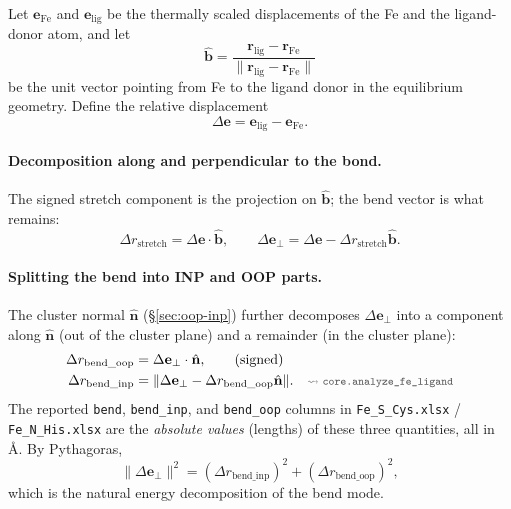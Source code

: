 \documentclass[11pt,a4paper,twoside]{article}
\newcommand{\evec}{\mathbf{e}}
\newcommand{\rvec}{\mathbf{r}}
\newcommand{\codref}[1]{%
  \quad\text{\textcolor{gray!70!black}{\footnotesize $\rightsquigarrow$~\texttt{#1}}}}
\theoremstyle{remark}
\begin{document}
Let $\evec_\text{Fe}$ and $\evec_\text{lig}$ be the thermally
scaled displacements of the Fe and the ligand-donor atom, and let
\begin{equation}
  \hat{\mathbf{b}} = \frac{\rvec_\text{lig} - \rvec_\text{Fe}}
                            {\lVert\rvec_\text{lig} - \rvec_\text{Fe}\rVert}
\end{equation}
be the unit vector pointing from Fe to the ligand donor in the
equilibrium geometry. Define the relative displacement
\begin{equation}
  \Delta\evec = \evec_\text{lig} - \evec_\text{Fe}.
  \label{eq:fe-lig-delta}
\end{equation}

\paragraph{Decomposition along and perpendicular to the bond.}
The signed stretch component is the projection on $\hat{\mathbf{b}}$;
the bend vector is what remains:
\begin{equation}
  \Delta r_\text{stretch} = \Delta\evec \cdot \hat{\mathbf{b}},
  \qquad
  \Delta\evec_\perp = \Delta\evec
                       - \Delta r_\text{stretch}\hat{\mathbf{b}}.
  \label{eq:fe-lig-perp}
\end{equation}

\paragraph{Splitting the bend into INP and OOP parts.}
The cluster normal $\hat{\mathbf{n}}$ (\S\ref{sec:oop-inp}) further
decomposes $\Delta\evec_\perp$ into a component along $\hat{\mathbf{n}}$
(out of the cluster plane) and a remainder (in the cluster plane):
\begin{align}
  \Delta r_\text{bend\_oop} &= \Delta\evec_\perp \cdot \hat{\mathbf{n}},
  \qquad\text{(signed)} \\
  \Delta r_\text{bend\_inp} &= \lVert\Delta\evec_\perp
       - \Delta r_\text{bend\_oop}\hat{\mathbf{n}}\rVert.
  \codref{core.analyze\_fe\_ligand}
  \label{eq:fe-lig-bend-split}
\end{align}
The reported \texttt{bend}, \texttt{bend\_inp}, and \texttt{bend\_oop}
columns in \texttt{Fe\_S\_Cys.xlsx} / \texttt{Fe\_N\_His.xlsx} are
the \emph{absolute values} (lengths) of these three quantities, all
in \AA{}. By Pythagoras,
\begin{equation}
  \lVert\Delta\evec_\perp\rVert^2
    = (\Delta r_\text{bend\_inp})^2 + (\Delta r_\text{bend\_oop})^2,
\end{equation}
which is the natural energy decomposition of the bend mode.
\end{document}
